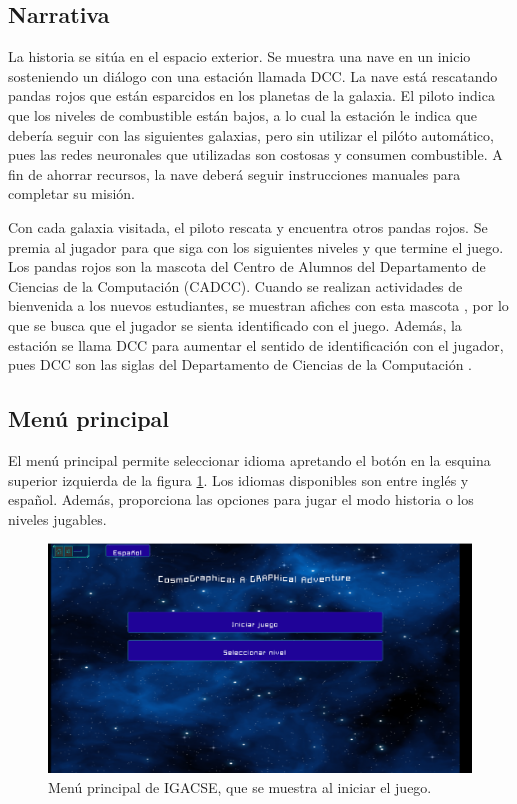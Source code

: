 \subsection{Narrativa}

La historia se sitúa en el espacio exterior. Se muestra una nave en un inicio sosteniendo un diálogo con una estación llamada DCC.
La nave está rescatando pandas rojos que están esparcidos en los planetas de la galaxia. El piloto indica que los niveles de combustible están bajos, a lo cual la estación le indica que debería seguir con las siguientes galaxias, pero sin utilizar el pilóto automático, pues las redes neuronales que utilizadas son costosas y consumen combustible. A fin de ahorrar recursos, la nave deberá seguir instrucciones manuales para completar su misión.

Con cada galaxia visitada, el piloto rescata y encuentra otros pandas rojos. Se premia al jugador para que siga con los siguientes niveles y que termine el juego. Los pandas rojos son la mascota del Centro de Alumnos del Departamento de Ciencias  de la Computación (CADCC). Cuando se realizan actividades de bienvenida a los nuevos estudiantes, se muestran afiches con esta mascota \cite{CADCCPage}, por lo que se busca que el jugador se sienta identificado con el juego. Además, la estación se llama DCC para aumentar el sentido de identificación con el jugador, pues DCC son las siglas del Departamento de Ciencias de la Computación \cite{DCCPage}.


\subsection{Menú principal}

El menú principal permite seleccionar idioma apretando el botón en la esquina superior izquierda de la figura \ref{MenuPrincipal}. Los idiomas disponibles son entre inglés y español. Además, proporciona las opciones para jugar el modo historia o los niveles jugables.

\begin{figure}[h]
	\centering
	\includegraphics[scale=0.3]{imagenes/MainMenu.png}
	\caption{Menú principal de IGACSE, que se muestra al iniciar el juego.}
	\label{MenuPrincipal}
\end{figure}


